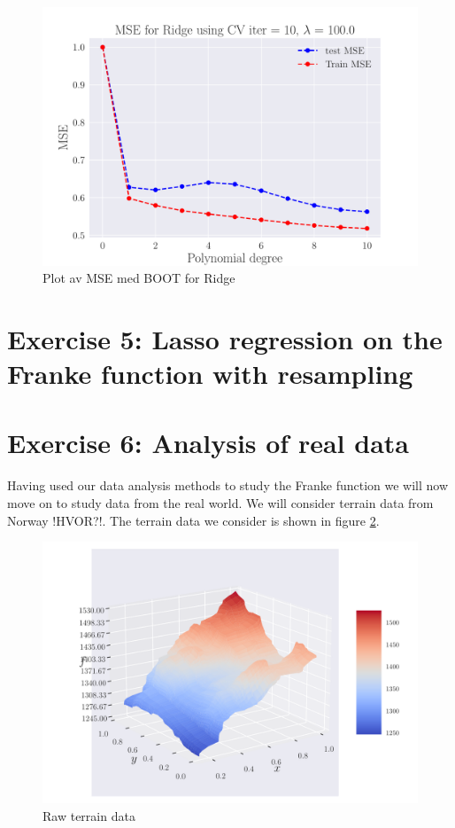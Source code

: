 \documentclass[reprint,english,notitlepage,aps,nobalancelastpage,nofootinbib]{revtex4-1}  %
\begin{document}
\begin{figure}[H]
	\endminipage\hfill
	\includegraphics[width=\linewidth]{MSE_Ridge_n30_eps02_pol10_CV_re10_lam_100_0.pdf}
	\endminipage
	\caption{Plot av MSE med BOOT for Ridge} \label{fig:Ridge_CV}
\end{figure}


\section*{Exercise 5: Lasso regression on the Franke function with resampling}


\section*{Exercise 6: Analysis of real data}

Having used our data analysis methods to study the Franke function we will now move on to study data from the real world. We will consider terrain data from Norway !HVOR?!. The terrain data we consider is shown in figure \ref{fig:terrain_raw}.

\begin{figure}[H]
  \includegraphics[width=\linewidth]{SRTM_rawdata_n50.pdf}
  \caption{Raw terrain data}
  \label{fig:terrain_raw}
\end{figure}
\end{document}
